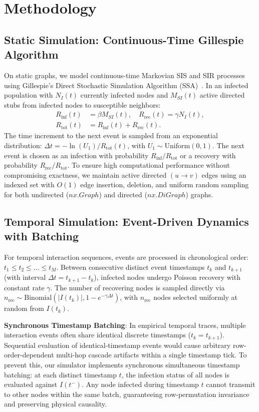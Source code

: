 \documentclass[conference]{IEEEtran}
\begin{document}
\section{Methodology}

\subsection{Static Simulation: Continuous-Time Gillespie Algorithm}
On static graphs, we model continuous-time Markovian SIS and SIR processes using Gillespie's Direct Stochastic Simulation Algorithm (SSA)~\cite{gillespie1977exact}. In an infected population with $N_I(t)$ currently infected nodes and $M_{SI}(t)$ active directed stubs from infected nodes to susceptible neighbors:
\begin{align}
R_{\text{inf}}(t) &= \beta M_{SI}(t), \quad R_{\text{rec}}(t) = \gamma N_I(t), \\
R_{\text{tot}}(t) &= R_{\text{inf}}(t) + R_{\text{rec}}(t).
\end{align}
The time increment to the next event is sampled from an exponential distribution: $\Delta t = -\ln(U_1) / R_{\text{tot}}(t)$, with $U_1 \sim \mathrm{Uniform}(0, 1)$. The next event is chosen as an infection with probability $R_{\text{inf}} / R_{\text{tot}}$ or a recovery with probability $R_{\text{rec}} / R_{\text{tot}}$. To ensure high computational performance without compromising exactness, we maintain active directed $(u \to v)$ edges using an indexed set with $O(1)$ edge insertion, deletion, and uniform random sampling for both undirected ($nx.Graph$) and directed ($nx.DiGraph$) graphs.

\subsection{Temporal Simulation: Event-Driven Dynamics with Batching}
For temporal interaction sequences, events are processed in chronological order: $t_1 \le t_2 \le \dots \le t_M$. Between consecutive distinct event timestamps $t_k$ and $t_{k+1}$ (with interval $\Delta t = t_{k+1} - t_k$), infected nodes undergo Poisson recovery with constant rate $\gamma$. The number of recovering nodes is sampled directly via $n_{\text{rec}} \sim \text{Binomial}\left(|I(t_k)|, 1 - e^{-\gamma \Delta t}\right)$, with $n_{\text{rec}}$ nodes selected uniformly at random from $I(t_k)$.

\textbf{Synchronous Timestamp Batching}: In empirical temporal traces, multiple interaction events often share identical discrete timestamps ($t_k = t_{k+1}$). Sequential evaluation of identical-timestamp events would cause arbitrary row-order-dependent multi-hop cascade artifacts within a single timestamp tick. To prevent this, our simulator implements synchronous simultaneous timestamp batching: at each distinct timestamp $t$, the infection status of all nodes is evaluated against $I(t^-)$. Any node infected during timestamp $t$ cannot transmit to other nodes within the same batch, guaranteeing row-permutation invariance and preserving physical causality.
\end{document}
